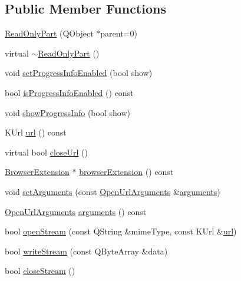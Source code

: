 \subsection*{\-Public \-Member \-Functions}
\begin{DoxyCompactItemize}
\item 
\hyperlink{classKParts_1_1ReadOnlyPart_ad8b7c3b0f0bc8303dc66c79d8ebc57e9}{\-Read\-Only\-Part} (\-Q\-Object $\ast$parent=0)
\item 
virtual \hyperlink{classKParts_1_1ReadOnlyPart_a8609199ca6addc35abf7f78b02e3236c}{$\sim$\-Read\-Only\-Part} ()
\item 
void \hyperlink{classKParts_1_1ReadOnlyPart_a95a547b488bc688035cffbd3df6f0b27}{set\-Progress\-Info\-Enabled} (bool show)
\item 
bool \hyperlink{classKParts_1_1ReadOnlyPart_aa1cff9c4698b9631d5bdd9f912f91568}{is\-Progress\-Info\-Enabled} () const 
\item 
void \hyperlink{classKParts_1_1ReadOnlyPart_ab3e6bd5d262b6b0b26acc003b2957c0b}{show\-Progress\-Info} (bool show)
\item 
\-K\-Url \hyperlink{classKParts_1_1ReadOnlyPart_aba05c3b2fd42dcfebc6585e4f746d2cb}{url} () const 
\item 
virtual bool \hyperlink{classKParts_1_1ReadOnlyPart_a1df069c3c0503f529dc9f0d7007f144d}{close\-Url} ()
\item 
\hyperlink{classKParts_1_1BrowserExtension}{\-Browser\-Extension} $\ast$ \hyperlink{classKParts_1_1ReadOnlyPart_a58d61ab4d2b2ed8d7944e1b02dbba0e2}{browser\-Extension} () const 
\item 
void \hyperlink{classKParts_1_1ReadOnlyPart_aab893a47747cad8bb29f1f95316140de}{set\-Arguments} (const \hyperlink{classKParts_1_1OpenUrlArguments}{\-Open\-Url\-Arguments} \&\hyperlink{classKParts_1_1ReadOnlyPart_a811e25200521dcf347bacb6be7ab8ecf}{arguments})
\item 
\hyperlink{classKParts_1_1OpenUrlArguments}{\-Open\-Url\-Arguments} \hyperlink{classKParts_1_1ReadOnlyPart_a811e25200521dcf347bacb6be7ab8ecf}{arguments} () const 
\item 
bool \hyperlink{classKParts_1_1ReadOnlyPart_aa3dacdfd6412d40f62ed75b02058b5e4}{open\-Stream} (const \-Q\-String \&mime\-Type, const \-K\-Url \&\hyperlink{classKParts_1_1ReadOnlyPart_a5b8edbf05a338814287496882adde559}{url})
\item 
bool \hyperlink{classKParts_1_1ReadOnlyPart_a5e6aac81ead43987e1711207b00878db}{write\-Stream} (const \-Q\-Byte\-Array \&data)
\item 
bool \hyperlink{classKParts_1_1ReadOnlyPart_a7af5ff9f593ee75dac30498ebf87c255}{close\-Stream} ()
\end{DoxyCompactItemize}
